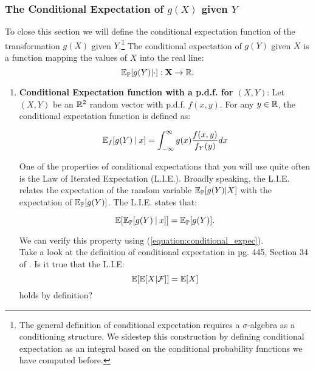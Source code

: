 \documentclass[11pt]{article} %
\begin{document}
\subsubsection{The Conditional Expectation of $g(X)$ given $Y$ }
To close this section we will define the conditional expectation function of the transformation $g(X)$ given $Y$.\footnote{The general definition of conditional expectation requires a $\sigma$-algebra as a conditioning structure. We sidestep this construction by defining conditional expectation as an integral based on the conditional probability functions we have computed before.} The conditional expectation of $g(Y)$ given $X$ is a function mapping the values of $X$ into the real line:
$$\mathbb{E}_{\mathbb{P}}[g(Y) | \cdot]: \mathbf{X} \rightarrow \mathbb{R}.$$ 

\begin{enumerate}
\item \textbf{Conditional Expectation function with a p.d.f. for $(X, Y)$}:  Let $(X,Y)$ be an $\mathbb{R}^2$ random vector with p.d.f. $f(x,y)$. For any $y \in \mathbb{R}$, the conditional expectation function is defined as: 

\begin{equation} \label{equation:conditional_expec}
\mathbb{E}_{f}[g(Y)\: | \: x ] = \int_{-\infty}^{\infty} g(x)\frac{f(x,y)}{f_{Y}(y)}dx 
\end{equation}

One of the properties of conditional expectations that you will use quite often is the Law of Iterated Expectation (L.I.E.). Broadly speaking, the L.I.E. relates the expectation of the random variable $\mathbb{E}_{\mathbb{P}}[g(Y) | X]$ with the expectation of $\mathbb{E}_{\mathbb{P}}[g(Y)]$. The L.I.E. states that:

\begin{equation}
\mathbb{E}[\mathbb{E}_{\mathbb{P}}[g(Y)\: | \: x ]]=\mathbb{E}_{\mathbb{P}}[g(Y)].
\end{equation}

We can verify this property using (\ref{equation:conditional_expec}).\\

 Take a look at the definition of conditional expectation in pg. 445, Section 34 of \cite{Billingsley95}. Is it true that the L.I.E:
$$\mathbb{E}[ \mathbb{E}[X | \mathcal{F}] ] = \mathbb{E}[X] $$
\noindent holds by definition? 
\end{enumerate}



\newpage




\end{document}
